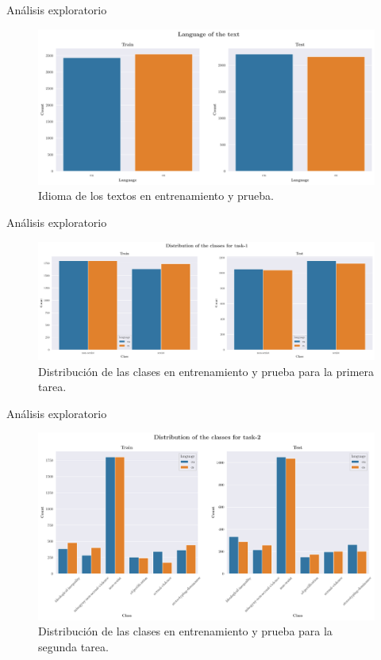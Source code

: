 \documentclass[10pt]{beamer}
\begin{document}
\begin{frame}{Análisis exploratorio}
\justify	
\small

\begin{figure}[H]
\centering
\includegraphics[width=0.8\linewidth]{images/language.pdf}
\caption{Idioma de los textos en entrenamiento y prueba.}
\end{figure}

\end{frame} 

\begin{frame}{Análisis exploratorio}
\justify	
\small

\begin{figure}[H]
\centering
\includegraphics[width=0.8\linewidth]{images/task1.pdf}
\caption{Distribución de las clases en entrenamiento y prueba para la primera tarea.}
\end{figure}

\end{frame} 

\begin{frame}{Análisis exploratorio}
\justify	
\small

\begin{figure}[H]
\centering
\includegraphics[width=0.8\linewidth]{images/task2.pdf}
\caption{Distribución de las clases en entrenamiento y prueba para la segunda tarea.}
\end{figure}

\end{frame} 
\end{document}
